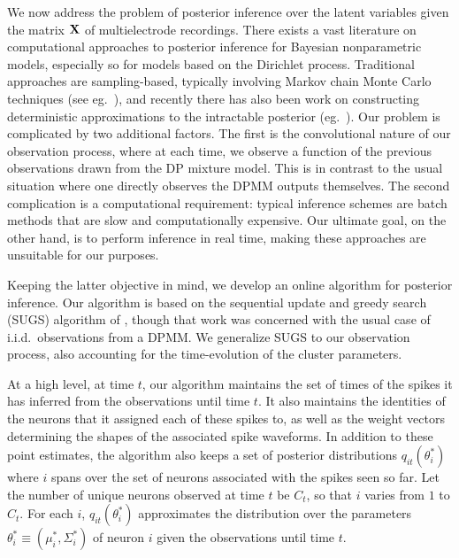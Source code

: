 \newcommand{\tx}{\tilde{x}}


We now address the problem of posterior inference over the latent variables given the matrix $\mathbf{X}$ of multielectrode recordings. 
There exists a vast literature on computational approaches to posterior inference for Bayesian nonparametric models, especially so for models based on the 
Dirichlet process.
Traditional approaches are sampling-based, typically involving Markov chain Monte Carlo techniques (see eg.\ \citep{Nea2000, IshJam2001}), 
and recently there has also been work on constructing deterministic approximations to the intractable posterior (eg.\ \citep{BleJor2006, MinGha2003}).
Our problem is complicated by two additional factors. The first is the convolutional nature of our observation process, 
where at each time,
we observe a function of the previous observations drawn from the DP mixture model. This is in contrast to the usual situation where one directly observes 
the DPMM outputs themselves.
The second complication is a computational requirement: typical inference schemes are batch methods that are slow and computationally expensive. 
Our ultimate goal, on the other hand, is to perform inference in real time, making these approaches are unsuitable for our purposes.

Keeping the latter objective in mind, we develop an online algorithm for posterior inference. Our algorithm is based on the sequential update and
greedy search (SUGS) algorithm of
\citep{WangDun2009}, though that work was concerned with the usual case of i.i.d.\ observations from a DPMM. We generalize SUGS to our 
observation process, also accounting for the time-evolution of the cluster parameters.

At a high level, at time $t$, our algorithm maintains the set of times of the spikes it has inferred from the observations until time $t$. It also maintains
the identities of the neurons that it assigned each of these spikes to, as well as the weight vectors determining the shapes of the associated spike 
waveforms. In addition to these point estimates, the algorithm also keeps a set of posterior distributions $q_{it}(\theta^*_i)$ where $i$ spans over the
set of neurons associated with the spikes seen so far. Let the number of unique neurons observed at time $t$ be $C_t$, so that $i$ varies from $1$ to $C_t$.
For each $i$, $q_{it}(\theta^*_i)$ approximates the distribution over the parameters 
$\theta_i^* \equiv (\mu_i^*, \Sigma_i^*)$ of neuron $i$ given the observations until time $t$. 

